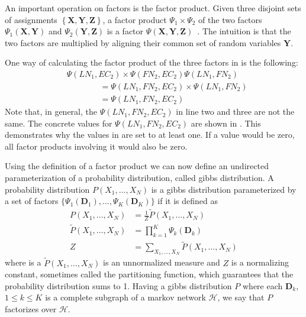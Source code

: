 \bigskip

An important operation on factors is the \gls{factor product}.
Given three disjoint sets of assignments $\left\{\mathbf{X}, \mathbf{Y}, \mathbf{Z}\right\}$, a \gls{factor product} $\Psi_1\times\Psi_2$ of the two factors $\Psi_1(\mathbf{X},\mathbf{Y})$ and $\Psi_2(\mathbf{Y},\mathbf{Z})$ is a factor $\Psi(\mathbf{X},\mathbf{Y},\mathbf{Z})$~\citep{koller2009probabilistic}.
The intuition is that the two factors are multiplied by aligning their common set of \glspl{random variable} $\mathbf{Y}$.

One way of calculating the \gls{factor product} of the three \glspl{factor} in  is the following:
\begin{equation*}
  \begin{split}
  &\Psi(LN_1,EC_2)\times\Psi(FN_2,EC_2)\Psi(LN_1,FN_2)\\
  &\hspace{4em}=\Psi(LN_1,FN_2,EC_2)\times\Psi(LN_1,FN_2)\\
  &\hspace{4em}=\Psi(LN_1,FN_2,EC_2)
  \end{split}
\end{equation*}
Note that, in general, the $\Psi(LN_1,FN_2,EC_2)$ in line two and three are not the same.
The concrete values for $\Psi(LN_1,FN_2,EC_2)$ are shown in .
This demonstrates why the values in  are set to at least one.
If a value would be zero, all factor products involving it would also be zero.

\bigskip

Using the definition of a \gls{factor product} we can now define an undirected parameterization of a \gls{probability distribution}, called \gls{gibbs distribution}.
A \gls{probability distribution} $P(X_1,\dots,X_N)$ is a \gls{gibbs distribution} parameterized by a set of \glspl{factor} $\{\Psi_1(\mathbf{D}_1),\dots,\Psi_K(\mathbf{D}_K)\}$ if it is defined as~\citep{koller2009probabilistic}
\begin{equation}
  \label{equ:gibbs-distribution}
  \begin{split}
  P\left(X_1,\dots,X_N\right) & =\frac{1}{Z}\tilde{P}\left(X_1,\dots,X_N\right) \\
  \tilde{P}\left(X_1,\dots,X_N\right) & =\prod_{k=1}^{K}\Psi_k\left(\mathbf{D}_k\right) \\
  Z & =\sum_{X_1,\ldots,X_N}\tilde{P}\left(X_1,\dots,X_N\right)
  \end{split}
\end{equation}
where is a $\tilde{P}(X_1,\dots,X_N)$ is an unnormalized measure and $Z$ is a normalizing constant, sometimes called the \gls{partitioning function}, which guarantees that the \gls{probability distribution} sums to 1.
Having a \gls{gibbs distribution} $P$ where each $\mathbf{D}_k$, $1\leq k \leq K$ is a complete subgraph of a \gls{markov network} $\mathcal{H}$, we say that $P$ factorizes over $\mathcal{H}$.~\citep{koller2009probabilistic}

